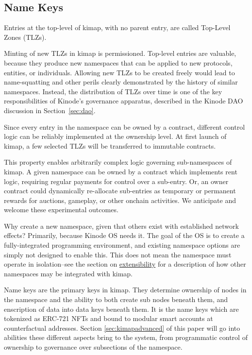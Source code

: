 \documentclass[runningheads]{llncs}
\begin{document}
\subsection{Name Keys}

Entries at the top-level of kimap, with no parent entry, are called Top-Level Zones (TLZs).

Minting of new TLZs in kimap is permissioned.
Top-level entries are valuable, because they produce new namespaces that can be applied to new protocols, entities, or individuals.
Allowing new TLZs to be created freely would lead to name-squatting and other perils clearly demonstrated by the history of similar namespaces. %
Instead, the distribution of TLZs over time is one of the key responsibilities of Kinode's governance apparatus, described in the Kinode DAO discussion in Section~\ref{sec:dao}.

Since every entry in the namespace can be owned by a contract, different control logic can be reliably implemented at the ownership level.
At first launch of kimap, a few selected TLZs will be transferred to immutable contracts. %

This property enables arbitrarily complex logic governing sub-namespaces of kimap.
A given namespace can be owned by a contract which implements rent logic, requiring regular payments for control over a sub-entry.
Or, an owner contract could dynamically re-allocate sub-entries as temporary or permanent rewards for auctions, gameplay, or other onchain activities.
We anticipate and welcome these experimental outcomes.

Why create a new namespace, given that others exist with established network effects?
Primarily, because Kinode OS needs it.
The goal of the OS is to create a fully-integrated programming environment, and existing namespace options are simply not designed to enable this.
This does not mean the namespace must operate in isolation–see the section on \hyperref[sec:extensibility]{extensibility} for a description of how other namespaces may be integrated with kimap.

Name keys are the primary keys in kimap.
They determine ownership of nodes in the namespace and the ability to both create sub nodes beneath them, and enscription of data into data keys beneath them.
It is the name keys which are tokenized as ERC-721 NFTs and bound to modular smart accounts at counterfactual addresses.
Section \ref{sec:kimapadvanced} of this paper will go into abilities these different aspects bring to the system, from programmatic control of ownership to governance over subsections of the namespace.
\end{document}
